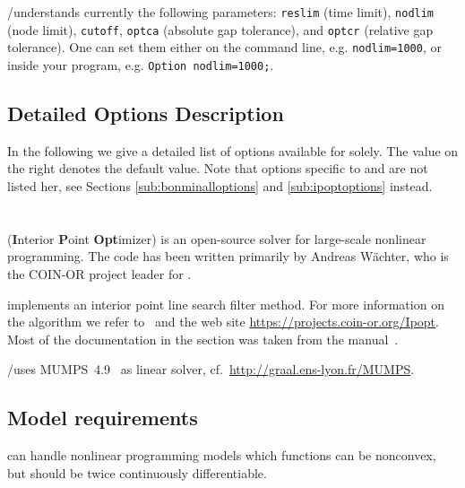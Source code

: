 \GAMS/\COUENNE understands currently the following \GAMS parameters: \texttt{reslim} (time limit), \texttt{nodlim} (node limit), \texttt{cutoff}, \texttt{optca} (absolute gap tolerance), and \texttt{optcr} (relative gap tolerance).
One can set them either on the command line, e.g. \verb+nodlim=1000+, or inside your \GAMS program, e.g. \verb+Option nodlim=1000;+.

\subsection{Detailed Options Description}
\label{sub:couenneoptions}

In the following we give a detailed list of options available for \COUENNE solely.
The value on the right denotes the default value.
Note that options specific to \IPOPT and \BONMIN are not listed her, see Sections \ref{sub:bonminalloptions} and \ref{sub:ipoptoptions} instead.



\section{\IPOPT}


\IPOPT (\textbf{I}nterior \textbf{P}oint \textbf{Opt}imizer) is an open-source solver for large-scale nonlinear programming.
The code has been written primarily by Andreas W\"achter, who is the COIN-OR project leader for \IPOPT.

\IPOPT implements an interior point line search filter method.
For more information on the algorithm we refer to~\cite{Waechter2002,WaBi06} and the \IPOPT web site \url{https://projects.coin-or.org/Ipopt}.
Most of the \IPOPT documentation in the section was taken from the \IPOPT manual~\cite{IpoptManual}.

\GAMS/\IPOPT uses \textsc{MUMPS}~4.9~\cite{AmestoyDuffKosterLExcellent2001,AmestoyGuermoucheLExcellentPralet2006} as linear solver, cf.~\url{http://graal.ens-lyon.fr/MUMPS}.

\subsection{Model requirements}

\IPOPT can handle nonlinear programming models which functions can be nonconvex, but should be twice continuously differentiable.

